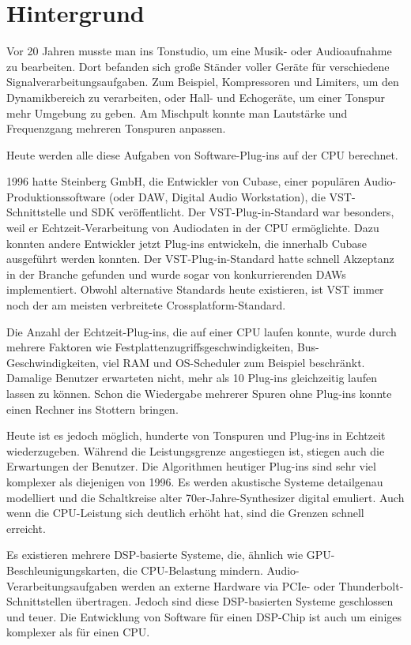 \section{Hintergrund}

Vor 20 Jahren musste man ins Tonstudio, um eine Musik- oder Audioaufnahme zu bearbeiten. Dort befanden sich große Ständer voller Geräte für verschiedene Signalverarbeitungsaufgaben. Zum Beispiel, Kompressoren und Limiters, um den Dynamikbereich zu verarbeiten, oder Hall- und Echogeräte, um einer Tonspur mehr  Umgebung zu geben. Am Mischpult konnte man Lautstärke und Frequenzgang mehreren Tonspuren anpassen.

Heute werden alle diese Aufgaben von Software-Plug-ins auf der CPU berechnet.

1996 hatte Steinberg GmbH, die Entwickler von Cubase, einer populären Audio-Produktionssoftware (oder DAW, Digital Audio Workstation), die VST-Schnittstelle und SDK veröffentlicht. Der VST-Plug-in-Standard war besonders, weil er Echtzeit-Verarbeitung von Audiodaten in der CPU ermöglichte. Dazu konnten andere Entwickler jetzt Plug-ins entwickeln, die innerhalb Cubase ausgeführt werden konnten. Der VST-Plug-in-Standard hatte schnell Akzeptanz in der Branche gefunden und wurde sogar von konkurrierenden DAWs implementiert. Obwohl alternative Standards heute existieren, ist VST immer noch der am meisten verbreitete Crossplatform-Standard.

Die Anzahl der Echtzeit-Plug-ins, die auf einer CPU laufen konnte, wurde durch mehrere Faktoren wie Festplattenzugriffsgeschwindigkeiten, Bus-Geschwindigkeiten, viel RAM und OS-Scheduler zum Beispiel beschränkt. Damalige Benutzer  erwarteten nicht, mehr als 10 Plug-ins gleichzeitig laufen lassen zu können. Schon die Wiedergabe mehrerer Spuren ohne Plug-ins konnte einen Rechner ins Stottern bringen.

Heute ist es jedoch möglich, hunderte von Tonspuren und Plug-ins in Echtzeit wiederzugeben. Während die Leistungsgrenze angestiegen ist, stiegen auch die Erwartungen der Benutzer. Die Algorithmen heutiger Plug-ins sind sehr viel komplexer als diejenigen von 1996. Es werden akustische Systeme detailgenau modelliert und die Schaltkreise alter 70er-Jahre-Synthesizer digital emuliert. Auch wenn die CPU-Leistung sich deutlich erhöht hat, sind die Grenzen schnell erreicht.

Es existieren mehrere DSP-basierte Systeme, die, ähnlich wie GPU-Beschleunigungskarten, die CPU-Belastung mindern. Audio-Verarbeitungsaufgaben werden an externe Hardware via PCIe- oder Thunderbolt-Schnittstellen übertragen. Jedoch sind diese DSP-basierten Systeme geschlossen und teuer. Die Entwicklung von Software für einen DSP-Chip ist auch um einiges komplexer als für einen CPU.
